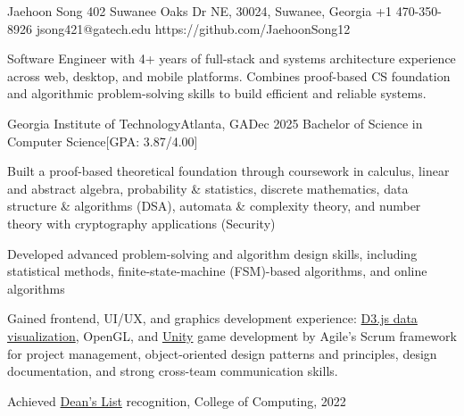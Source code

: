 % 
\begin{resume-header}{Jaehoon Song}
  {402 Suwanee Oaks Dr NE, 30024, Suwanee, Georgia}
  {+1 470-350-8926}
  {jsong421@gatech.edu}
  {https://github.com/JaehoonSong12}
\end{resume-header}
\begin{resume-objective}
Software Engineer with 4+ years of full-stack and systems 
architecture experience across web, desktop, and mobile 
platforms. Combines proof-based CS foundation and algorithmic problem-solving skills 
to build efficient and reliable systems.
\end{resume-objective}
\begin{resume-itemize}
  {Georgia Institute of Technology}{Atlanta, GA}{Dec 2025}
  {Bachelor of Science in Computer Science}[GPA: 3.87/4.00]
    \item Built a proof-based theoretical foundation through coursework in calculus, 
    linear and abstract algebra, probability \& statistics, discrete mathematics, 
    data structure \& algorithms (DSA), automata \& complexity theory, and number 
    theory with cryptography applications (Security)
    \item Developed advanced problem-solving and algorithm design skills, 
    including statistical methods, finite-state-machine (FSM)-based algorithms, 
    and online algorithms
    \item Gained frontend, UI/UX, and graphics development experience: 
    \href{https://jaehoonsong12.github.io/}{D3.js data visualization}, OpenGL, 
    and \href{https://github.com/YundaeLeeSong/ydjs-references/tree/main/project2409-game_shadowwalker}{Unity} 
    game development
    by Agile's Scrum framework for project management, 
    object-oriented design patterns and principles, 
    design documentation, and 
    strong cross-team communication skills.
    \item Achieved \href{https://gatech.meritpages.com/stories/Jaehoon-Song-Named-to-Dean-s-List-at-Georgia-Tech-for-the-Summer-2022-Semester/104219189}{Dean's List} recognition, College of Computing, 2022
\end{resume-itemize}
